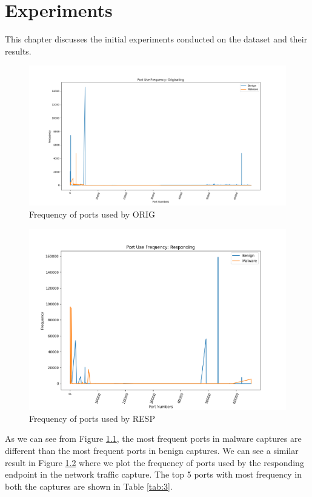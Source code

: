 \chapter{Experiments\label{chap:experiments}}

This chapter discusses the initial experiments conducted on the dataset and their results.

\begin{figure}[htb]
	\centering
	\includegraphics[width=1\textwidth]{images/orig-port-freq.png}
	\caption{Frequency of ports used by ORIG} 
	\label{fig:orig-port-freq}
\end{figure}

\begin{figure}[htb]
	\centering
	\includegraphics[width=1\textwidth]{images/resp-port-freq.png}
	\caption{Frequency of ports used by RESP} 
	\label{fig:resp-port-freq}
\end{figure}

As we can see from Figure \ref{fig:orig-port-freq}, the most frequent ports in malware captures are different than the most frequent ports in benign captures. We can see a similar result in Figure \ref{fig:resp-port-freq} where we plot the frequency of ports used by the responding endpoint in the network traffic capture. The top 5 ports with most frequency in both the captures are shown in Table \ref{tab:3}.

